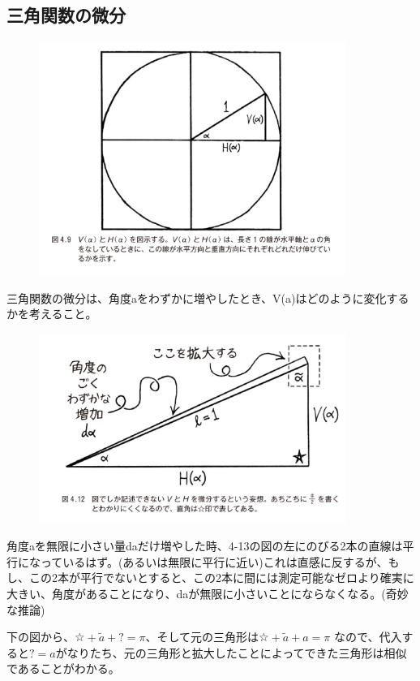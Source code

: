 \documentclass[dvipdfmx]{jsarticle}
\begin{document}
\begin{enumerate}
\subsection{三角関数の微分}

\begin{figure}[h]
  \centering
  \includegraphics[width=10cm]{images/burn_math_4-9.png}
\end{figure}

三角関数の微分は、角度aをわずかに増やしたとき、V(a)はどのように変化するかを考えること。

\begin{figure}[h]
  \centering
  \includegraphics[width=10cm]{images/burn_math_4-12.png}
\end{figure}


角度aを無限に小さい量daだけ増やした時、4-13の図の左にのびる2本の直線は平行になっているはず。(あるいは無限に平行に近い)これは直感に反するが、もし、この2本が平行でないとすると、この2本に間には測定可能なゼロより確実に大きい、角度があることになり、daが無限に小さいことにならなくなる。(奇妙な推論)

下の図から、$☆ + \tilde{a} + ? = \pi $、そして元の三角形は$☆+ \tilde{a} + a = \pi$ なので、代入すると$? = a$がなりたち、元の三角形と拡大したことによってできた三角形は相似であることがわかる。


\end{enumerate}
\end{document}

